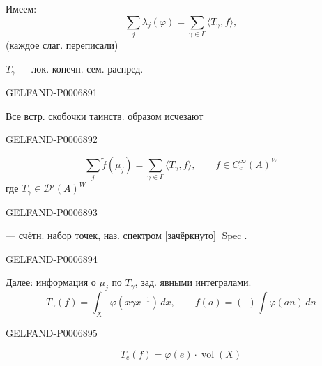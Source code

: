 Имеем:
\[
\sum_j\lambda_j(\varphi)=\sum_{\gamma\in\Gamma}\langle T_\gamma,f\rangle,
\]
(каждое слаг. переписали)

\(T_\gamma\) --- лок. конечн. сем. распред.


\begin{GelfandAdjacentEvidence}{GELFAND-P000689}{1}

Все встр. скобочки таинств. образом исчезают
\end{GelfandAdjacentEvidence}
\begin{GelfandAdjacentEvidence}{GELFAND-P000689}{2}

\[
\sum_j\widetilde f(\mu_j)
=\sum_{\gamma\in\Gamma}\langle T_\gamma,f\rangle,\qquad
f\in C_c^\infty(A)^W
\]
где \(T_\gamma\in\mathcal D'(A)^W\)

\end{GelfandAdjacentEvidence}
\begin{GelfandAdjacentEvidence}{GELFAND-P000689}{3}

--- счётн. набор точек, наз. спектром [зачёркнуто] \underline{\(\operatorname{Spec}\)}.
\end{GelfandAdjacentEvidence}
\begin{GelfandAdjacentEvidence}{GELFAND-P000689}{4}


Далее: информация о \(\mu_j\) по \(T_\gamma\), зад. явными интегралами.
\[
T_\gamma(f)=\int_X\varphi(x\gamma x^{-1})\,dx,\qquad
f(a)=(\ \ )\int\varphi(an)\,dn
\]
\end{GelfandAdjacentEvidence}
\begin{GelfandAdjacentEvidence}{GELFAND-P000689}{5}

\[
T_e(f)=\varphi(e)\cdot\operatorname{vol}(X)
\]
\end{GelfandAdjacentEvidence}

